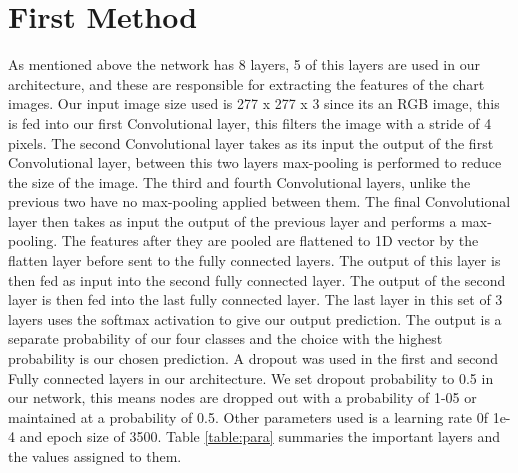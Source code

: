 \documentclass[12pt, a4paper,oneside]{report}
\begin{document}
\section{First Method}
As mentioned above the network has 8 layers, 5 of this layers are used in our architecture, and these are responsible for extracting the  features of the chart images. Our input image size used is 277 x 277 x 3  since its an RGB image, this is fed into our first Convolutional layer, this filters the image with a stride of 4 pixels. The second Convolutional layer takes as its input the output of the first Convolutional layer, between this two layers max-pooling is performed to reduce the size of the image. The third and fourth Convolutional layers, unlike the previous two have no max-pooling applied between them. The final Convolutional layer then takes as input the output of the previous layer and performs a max-pooling. The features after they are pooled are flattened to 1D vector by the flatten layer before sent to the fully connected layers. The output of this layer is then fed as input into the second fully connected layer. The output of the second layer is then fed into the last fully connected layer. The last layer in this set of 3 layers uses the softmax activation to give our output prediction. The output is a separate probability of our four classes and the choice with the highest probability is our chosen prediction. A dropout was used in the first and second Fully connected layers in our architecture. We set dropout probability to 0.5 in our network, this means nodes are dropped out with a probability of 1-05 or maintained at a probability of 0.5. Other parameters used is a learning rate 0f 1e-4 and epoch size of 3500. Table \ref{table:para} summaries the important layers and the values assigned to them.
\end{document}
